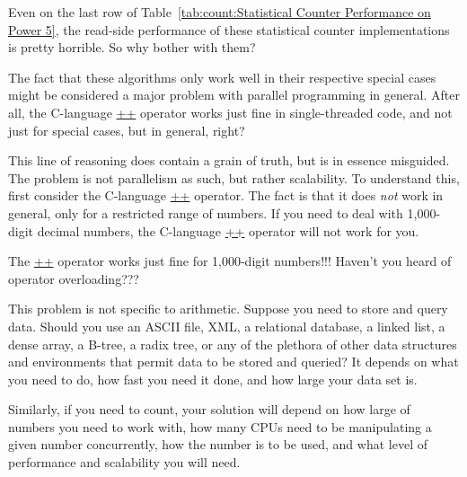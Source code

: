 \QuickQuiz{}
	Even on the last row of
	Table~\ref{tab:count:Statistical Counter Performance on Power 5},
	the read-side performance of these statistical counter
	implementations is pretty horrible.
	So why bother with them?
 \QuickQuizEnd

The fact that these algorithms only work well in their respective special
cases might be considered a major problem with parallel programming in
general.
After all, the C-language \url{++} operator works just fine in single-threaded
code, and not just for special cases, but in general, right?

This line of reasoning does contain a grain of truth, but is in essence
misguided.
The problem is not parallelism as such, but rather scalability.
To understand this, first consider the C-language \url{++} operator.
The fact is that it does \emph{not} work in general, only for a restricted
range of numbers.
If you need to deal with 1,000-digit decimal numbers, the C-language \url{++}
operator will not work for you.

\QuickQuiz{}
	The \url{++} operator works just fine for 1,000-digit numbers!!!
	Haven't you heard of operator overloading???
 \QuickQuizEnd

This problem is not specific to arithmetic.
Suppose you need to store and query data.
Should you use an ASCII file, XML, a relational database, a linked list,
a dense array, a B-tree, a radix tree, or any of the plethora of other data
structures and environments that permit data to be stored and queried?
It depends on what you need to do, how fast you need it done, and how
large your data set is.

Similarly, if you need to count, your solution will depend on how large
of numbers you need to work with, how many CPUs need to be manipulating
a given number concurrently, how the number is to be used, and what
level of performance and scalability you will need.

